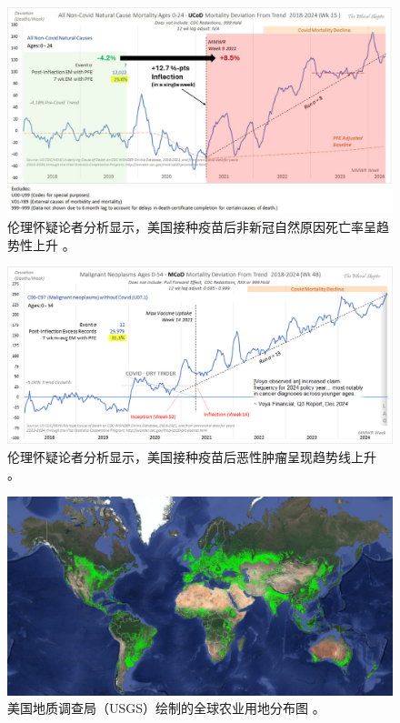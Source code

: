 \documentclass[10pt,twocolumn,letterpaper]{article}
\begin{document}
\begin{figure}[t]
\begin{center}
\includegraphics[width=1\textwidth]{tes1.jpeg}
\end{center}
   \caption{伦理怀疑论者分析显示，美国接种疫苗后非新冠自然原因死亡率呈趋势性上升 \cite{42}。}
   \label{fig:18}
\end{figure}

\begin{figure}[t]
\begin{center}
\includegraphics[width=1\textwidth]{tes2.png}
\end{center}
   \caption{伦理怀疑论者分析显示，美国接种疫苗后恶性肿瘤呈现趋势线上升 \cite{42}。}
   \label{fig:19}
\end{figure}

\clearpage
\twocolumn

\begin{figure}[t]
\begin{center}
\includegraphics[width=1\textwidth]{farmcrop.PNG}
\end{center}
\caption{美国地质调查局（USGS）绘制的全球农业用地分布图 \cite{45}。}
\label{fig:20}
\end{figure}
\end{document}
